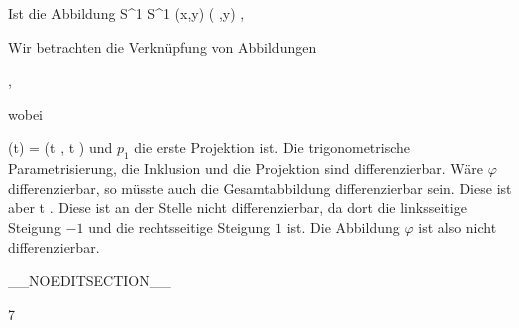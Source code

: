 {

Ist die Abbildung
\maabbeledisp {\varphi} {S^1} {S^1
} {(x,y)} {(  ,y)
} {,}

}
{

Wir betrachten die Verknüpfung von Abbildungen

 { , }

wobei

\mavergleichskettedisp
{\vergleichskette
{ \theta(t)
}
{ =} {(\cos  t , \sin  t )
}
{ } {
}
{ } {
}
{ } {
}
}
{}{}{}
und $p_1$ die erste Projektion ist. Die trigonometrische Parametrisierung, die Inklusion
 {} {}
und die Projektion sind differenzierbar. Wäre $\varphi$ differenzierbar, so müsste auch die Gesamtabbildung differenzierbar sein. Diese ist aber
\maabbeledisp {} {\R} {\R
} { t } {
} {.}
Diese ist an der Stelle
 nicht differenzierbar, da dort die linksseitige Steigung $-1$ und die rechtsseitige Steigung $1$ ist. Die Abbildung $\varphi$ ist also nicht differenzierbar.

 }

__NOEDITSECTION__

{7}

